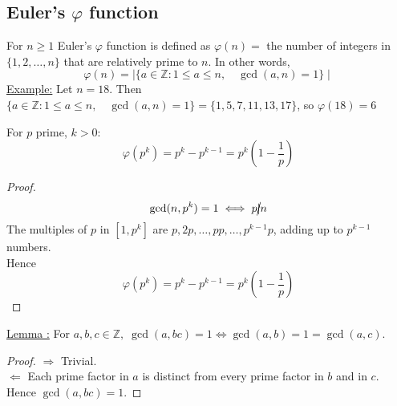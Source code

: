 \documentclass{report}
\begin{document}
\subsection*{Euler's $\varphi$ function} 
For $n\geq 1$ Euler's $\varphi$ function is defined as $\varphi(n)=$ the number of integers in $\{1,2,\dots,n\}$ that are relatively prime to $n$. In other words,
													\[\varphi(n)=\mid \{ a \in \mathbb{Z} :1 \leq a \leq n,\quad \gcd(a,n)=1 \} \mid \]
\underline{Example:} Let $n = 18$. Then $\{ a \in \mathbb{Z} :1 \leq a \leq n,\quad \gcd(a,n)=1 \} = \{1,5,7,11,13,17\}$, so $\varphi(18)=6$\\
\begin{thm}
				For $p$ prime, $k>0$:
															\[\varphi(p^k)=p^k-p^{k-1}=p^k(1-\frac{1}{p})\]
\end{thm}
\begin{proof}
				\[\gcd(n,p^k)=1 \iff p \cancel{\mid} n\]
				The multiples of $p$ in $[1, p^k]$ are $p, 2p, \dots,pp, \dots, p^{k-1}p$, adding up to $p^{k-1}$ numbers.\\
				Hence \[\varphi(p^k) =p^k-p^{k-1}=p^k(1-\frac{1}{p})\]
\end{proof}
\underline{Lemma :} For $a,b,c \in \mathbb{Z},\; \gcd(a,bc)=1 \iff \gcd(a,b)=1=\gcd(a,c)$.
\begin{proof}
		\underline{$\Rightarrow$} Trivial.\\
		\underline{$\Leftarrow$} Each prime factor in $a$ is distinct from every prime factor in $b$ and in $c$. Hence $\gcd(a,bc)=1$.
\end{proof}
\end{document}
